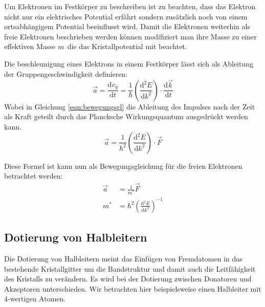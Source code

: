 Um Elektronen im Festkörper zu beschreiben ist zu beachten, dass das Elektron nicht nur ein elektrisches Potential erfährt sondern zusätzlich noch von einem ortsabhängigem Potential beeinflusst wird.
Damit die Elektronen weiterhin als freie Elektronen beschrieben werden können modifiziert man ihre Masse zu einer effektiven Masse $m^{\*}$ die das Kristallpotential mit beachtet.

Die beschleunigung eines Elektrons in einem Festkörper lässt sich als Ableitung der Gruppengeschwindigkeit definieren:
\begin{equation}
    \vec{a} = \frac{\text{d}v_g}{\text{d}t} = \frac{1}{\hbar} \left( \frac{\text{d}^2 E}{\text{d}k^2}\right) \cdot \frac{\text{d}\vec{k}}{\text{d}t}
    \label{eqn:bewegungsgl}
\end{equation}
Wobei in Gleichung \ref{eqn:bewegungsgl} die Ableitung des Impulses nach der Zeit als Kraft geteilt durch das Plancksche Wirkungsquantum ausgedrückt werden kann.
\begin{equation}
    \vec{a} = \frac{1}{\hbar^2} \left( \frac{\text{d}^2 E}{\text{d}k^2}\right) \cdot \vec{F}
\end{equation}

Diese Formel ist kann nun als Bewegungsgleichung für die freien Elektronen betrachtet werden:
\begin{align}
    \vec{a} &= \frac{1}{m^{*}} \vec{F}\\
    m^{*} &= \hbar^2 \left( \frac{\text{d}^2 E}{\text{d}k^2}\right)^{-1}
\end{align}

\subsection{Dotierung von Halbleitern}
Die Dotierung von Halbleitern meint das Einfügen von Fremdatomen in das bestehende Kristallgitter um die Bandstruktur und damit auch die Leitfähigkeit des Kristalls zu verändern.
Es wird bei der Dotierung zwischen Donatoren und Akzeptoren unterschieden.
Wir betrachten hier beispielsweise einen Halbleiter mit 4-wertigen Atomen.

